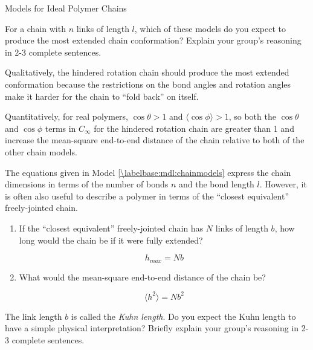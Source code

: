 \begin{activity}{Models for Ideal Polymer Chains}
\begin{ctqs}
	\question For a chain with $n$ links of length $l$, which of these models do you expect to produce the most extended chain conformation?  Explain your group's reasoning in 2-3 complete sentences. \label{\labelbase:ctq:stiffness}
	
		\begin{solution}[1.5in]
			Qualitatively, the hindered rotation chain should produce the most extended conformation because the restrictions on the bond angles and rotation angles make it harder for the chain to ``fold back'' on itself.
			
			Quantitatively, for real polymers, $\cos\theta > 1$ and $\langle \cos\phi \rangle > 1$, so both the $\cos \theta$ and $\cos \phi$ terms in $C_\infty$ for the hindered rotation chain are greater than 1 and increase the mean-square end-to-end distance of the chain relative to both of the other chain models.
		\end{solution}

	
	\question The equations given in Model \ref{\labelbase:mdl:chainmodels} express the chain dimensions in terms of the number of bonds $n$ and the bond length $l$.  However, it is often also useful to describe a polymer in terms of the ``closest equivalent'' freely-jointed chain. \label{\labelbase:ctq:statseg}
	
		\begin{enumerate}
			\item  If the ``closest equivalent'' freely-jointed chain has $N$ links of length $b$, how long would the chain be if it were fully extended? \label{\labelbase:ctq:Nb}
	
		\begin{solution}[0.75in]
			\begin{equation*}
				h_{max} = Nb
			\end{equation*}
		\end{solution}
			
			\item What would the mean-square end-to-end distance of the chain be? \label{\labelbase:ctq:Nb2}
	
		\begin{solution}[0.75in]
			\begin{equation*}
				\langle h^2 \rangle = Nb^2
			\end{equation*}
		\end{solution}
		
		\end{enumerate}
		
	\question The link length $b$ is called the \emph{Kuhn length}.  Do you expect the Kuhn length to have a simple physical interpretation?  Briefly explain your group's reasoning in 2-3 complete sentences.\label{\labelbase:exc:statseginterp}
	

\end{ctqs}
\end{activity}
